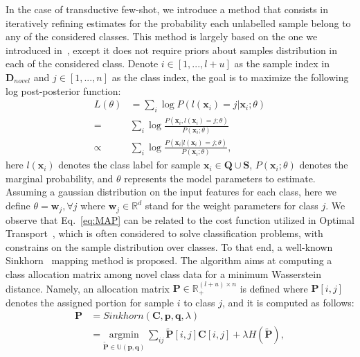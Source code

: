 \documentclass[review]{elsarticle}
\begin{document}
In the case of transductive few-shot, we introduce a method that consists in iteratively refining estimates for the probability each unlabelled sample belong to any of the considered classes. This method is largely based on the one we introduced in~\cite{hu2021leveraging}, except it does not require priors about samples distribution in each of the considered class. Denote $i\in[1,...,l+u]$ as the sample index in $\mathbf{D}_{novel}$ and $j\in[1,...,n]$ as the class index, the goal is to maximize the following log post-posterior function: 
\begin{equation}
\begin{split}
    L(\theta)&= \sum_i \log P(l(\mathbf{x}_i)=j | \mathbf{x}_i ; \theta) \\
    = & \sum_i \log \frac{P(\mathbf{x}_i, l(\mathbf{x}_i)=j ; \theta) }{P(\mathbf{x}_i; \theta)} \\
    \propto & \sum_i \log \frac{P(\mathbf{x}_i | l(\mathbf{x}_i)=j ; \theta)}{ P(\mathbf{x}_i; \theta)},
\end{split}
\label{eq:MAP}
\end{equation}
here $l(\mathbf{x}_i)$ denotes the class label for sample $\mathbf{x}_i\in\mathbf{Q}	\cup\mathbf{S}$, $P(\mathbf{x}_i; \theta)$ denotes the marginal probability, and $\theta$ represents the model parameters to estimate. Assuming a gaussian distribution on the input features for each class, here we define $\theta=\mathbf{w}_j, \forall j$ where $\mathbf{w}_j\in\mathbb{R}^d$ stand for the weight parameters for class $j$. We observe that Eq.~\ref{eq:MAP} can be related to the cost function utilized in Optimal Transport~\cite{villani2008optimal}, which is often considered to solve classification problems, with constrains on the sample distribution over classes. To that end, a well-known  Sinkhorn~\cite{cuturi2013sinkhorn} mapping method is proposed. The algorithm aims at computing a class allocation matrix among novel class data for a minimum Wasserstein distance. Namely, an allocation matrix $\mathbf{P}\in\mathbb{R}_{+}^{(l+u) \times n}$ is defined where $\mathbf{P}[i,j]$ denotes the assigned portion for sample $i$ to class $j$, and it is computed as follows:
\begin{equation}
\begin{split}
\mathbf{P}&= Sinkhorn(\mathbf{C}, \mathbf{p}, \mathbf{q}, \lambda) \\
&= \underset{\mathbf{\tilde{P}}\in\mathbb{U}(\mathbf{p},\mathbf{q})}{\mathrm{argmin}}\, \sum_{ij}\mathbf{\tilde{P}}[i,j]\mathbf{C}[i,j]  + \lambda H(\mathbf{\tilde{P}}),
\end{split}
\label{eq:P}
\end{equation}
\end{document}
